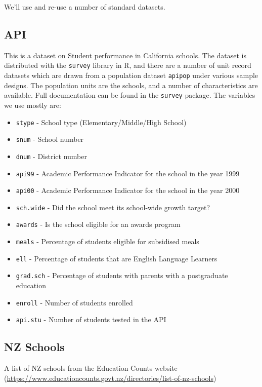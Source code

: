 \documentclass[
]{book}
\providecommand{\tightlist}{%
  \setlength{\itemsep}{0pt}\setlength{\parskip}{0pt}}
\begin{document}
We'll use and re-use a number of standard datasets.

\subsection{API}\label{api}

This is a dataset on Student performance in California schools. The dataset is distributed with the \texttt{survey} library in R, and there are a number of unit record datasets which are drawn from a population dataset \texttt{apipop} under various sample designs. The population units are the schools, and a number of characteristics are available. Full documentation can be found in the \texttt{survey} package. The variables we use mostly are:

\begin{itemize}
\tightlist
\item
  \texttt{stype} - School type (Elementary/Middle/High School)
\item
  \texttt{snum} - School number
\item
  \texttt{dnum} - District number
\item
  \texttt{api99} - Academic Performance Indicator for the school in the year 1999
\item
  \texttt{api00} - Academic Performance Indicator for the school in the year 2000
\item
  \texttt{sch.wide} - Did the school meet its school-wide growth target?
\item
  \texttt{awards} - Is the school eligible for an awards program
\item
  \texttt{meals} - Percentage of students eligible for subsidised meals
\item
  \texttt{ell} - Percentage of students that are English Language Learners
\item
  \texttt{grad.sch} - Percentage of students with parents with a postgraduate education
\item
  \texttt{enroll} - Number of students enrolled
\item
  \texttt{api.stu} - Number of students tested in the API
\end{itemize}

\subsection{NZ Schools}\label{nz-schools}

A list of NZ schools from the Education Counts website (\url{https://www.educationcounts.govt.nz/directories/list-of-nz-schools})
\end{document}
